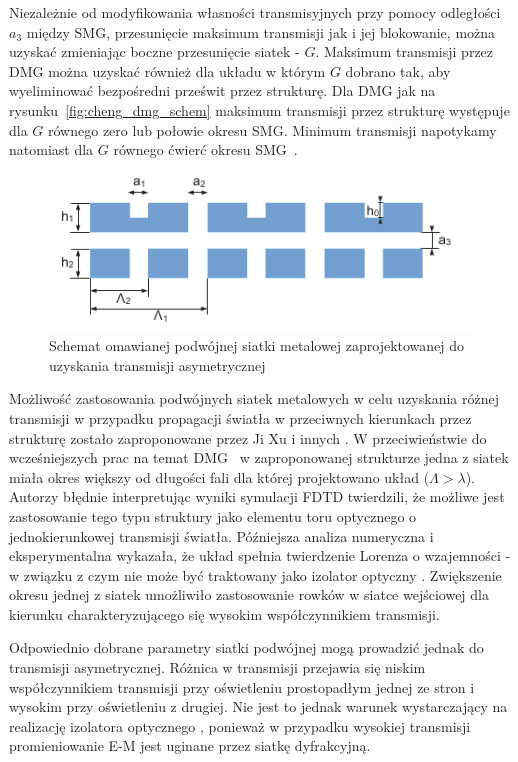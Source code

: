 Niezależnie od modyfikowania własności transmisyjnych przy pomocy odległości $a_3$ między SMG, przesunięcie maksimum transmisji jak i jej blokowanie, można uzyskać zmieniając boczne przesunięcie siatek - $G$. Maksimum transmisji przez DMG można uzyskać również dla układu w którym $G$ dobrano tak, aby wyeliminować bezpośredni prześwit przez strukturę. Dla DMG jak na rysunku~\ref{fig:cheng_dmg_schem} maksimum transmisji przez strukturę występuje dla $G$ równego zero lub połowie okresu SMG. Minimum transmisji napotykamy natomiast dla $G$ równego ćwierć okresu SMG~\cite{chan2006optical}.

\begin{figure}[tb]
	\includegraphics[width=\textwidth]{images/thz/1D-DMG-schemat.png}
	\caption{Schemat omawianej podwójnej siatki metalowej zaprojektowanej do uzyskania transmisji asymetrycznej}
	\label{fig:1ddmg-schem}
\end{figure}


Możliwość zastosowania podwójnych siatek metalowych w celu uzyskania różnej transmisji w przypadku propagacji światła w przeciwnych kierunkach przez strukturę zostało zaproponowane przez Ji Xu i innych \cite{xu2011unidirectional}. W przeciwieństwie do wcześniejszych prac na temat DMG~\cite{cheng2007controllable,cheng2008physical,chan2006optical} w zaproponowanej strukturze jedna z siatek miała okres większy od długości fali dla której projektowano układ ($\Lambda>\lambda$). Autorzy błędnie interpretując wyniki symulacji FDTD twierdzili, że możliwe jest zastosowanie tego typu struktury jako elementu toru optycznego o jednokierunkowej transmisji światła. Późniejsza analiza numeryczna i eksperymentalna wykazała, że układ spełnia twierdzenie Lorenza o wzajemności - w związku z czym nie może być  traktowany jako izolator optyczny \cite{jalas2013and}. Zwiększenie okresu jednej z siatek umożliwiło zastosowanie rowków w siatce wejściowej dla kierunku charakteryzującego się wysokim współczynnikiem transmisji\cite{xu2011unidirectional}.

Odpowiednio dobrane parametry siatki podwójnej mogą prowadzić jednak do transmisji asymetrycznej. Różnica w transmisji przejawia się niskim współczynnikiem transmisji przy oświetleniu prostopadłym jednej ze stron i wysokim przy oświetleniu z drugiej. Nie jest to jednak warunek wystarczający na realizację izolatora optycznego \cite{jalas2013and}, ponieważ w przypadku wysokiej transmisji promieniowanie E-M jest uginane przez siatkę dyfrakcyjną. 

